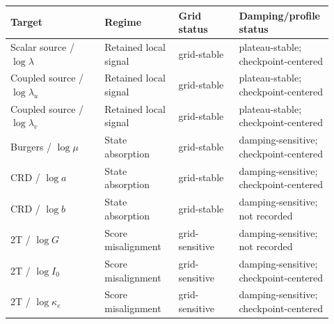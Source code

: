 \documentclass[preprint,12pt]{elsarticle}
\begin{document}
\begin{landscape}
\begingroup
\small
\setlength{\tabcolsep}{6pt}
\renewcommand{\arraystretch}{1.12}
\begin{center}
\label{tab:s5_consistency}
\begin{tabular}{p{0.28\linewidth}p{0.22\linewidth}p{0.18\linewidth}p{0.24\linewidth}}
\toprule
Target & Regime & Grid status & Damping/profile status \\
\midrule
Scalar source / $\log\lambda$ & Retained local signal & grid-stable & plateau-stable; checkpoint-centered \\
Coupled source / $\log\lambda_u$ & Retained local signal & grid-stable & plateau-stable; checkpoint-centered \\
Coupled source / $\log\lambda_v$ & Retained local signal & grid-stable & plateau-stable; checkpoint-centered \\
Burgers / $\log\mu$ & State absorption & grid-stable & damping-sensitive; checkpoint-centered \\
CRD / $\log a$ & State absorption & grid-stable & damping-sensitive; checkpoint-centered \\
CRD / $\log b$ & State absorption & grid-stable & damping-sensitive; not recorded \\
2T / $\log G$ & Score misalignment & grid-sensitive & damping-sensitive; not recorded \\
2T / $\log I_0$ & Score misalignment & grid-sensitive & damping-sensitive; checkpoint-centered \\
2T / $\log\kappa_e$ & Score misalignment & grid-sensitive & damping-sensitive; checkpoint-centered \\
\bottomrule
\end{tabular}
\end{center}
\endgroup
\end{landscape}
\end{document}

